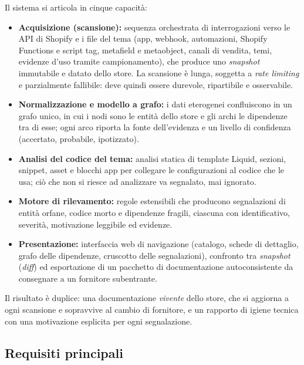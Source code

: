 Il sistema si articola in cinque capacità:
\begin{itemize}
    \item \textbf{Acquisizione (scansione):} sequenza orchestrata di interrogazioni verso le API di Shopify e i file del tema (app, webhook, automazioni, Shopify Functions e script tag, metafield e metaobject, canali di vendita, temi, evidenze d'uso tramite campionamento), che produce uno \emph{snapshot} immutabile e datato dello store. La scansione è lunga, soggetta a \emph{rate limiting} e parzialmente fallibile: deve quindi essere durevole, ripartibile e osservabile.
    \item \textbf{Normalizzazione e modello a grafo:} i dati eterogenei confluiscono in un grafo unico, in cui i nodi sono le entità dello store e gli archi le dipendenze tra di esse; ogni arco riporta la fonte dell'evidenza e un livello di confidenza (accertato, probabile, ipotizzato).
    \item \textbf{Analisi del codice del tema:} analisi statica di template Liquid, sezioni, snippet, asset e blocchi app per collegare le configurazioni al codice che le usa; ciò che non si riesce ad analizzare va segnalato, mai ignorato.
    \item \textbf{Motore di rilevamento:} regole estensibili che producono segnalazioni di entità orfane, codice morto e dipendenze fragili, ciascuna con identificativo, severità, motivazione leggibile ed evidenze.
    \item \textbf{Presentazione:} interfaccia web di navigazione (catalogo, schede di dettaglio, grafo delle dipendenze, cruscotto delle segnalazioni), confronto tra \emph{snapshot} (\emph{diff}) ed esportazione di un pacchetto di documentazione autoconsistente da consegnare a un fornitore subentrante.
\end{itemize}

Il risultato è duplice: una documentazione \emph{vivente} dello store, che si aggiorna a ogni scansione e sopravvive al cambio di fornitore, e un rapporto di igiene tecnica con una motivazione esplicita per ogni segnalazione.

\subsection{Requisiti principali}

